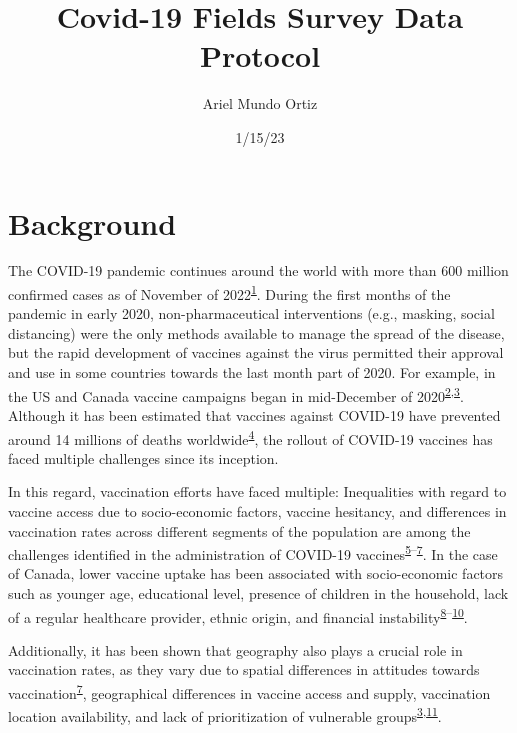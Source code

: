 \documentclass[
  letterpaper,
  DIV=11,
  numbers=noendperiod]{scrartcl}
\title{Covid-19 Fields Survey Data Protocol}
\author{Ariel Mundo Ortiz}
\date{1/15/23}
\begin{document}
\maketitle
\ifdefined\Shaded\renewenvironment{Shaded}{\begin{tcolorbox}[borderline west={3pt}{0pt}{shadecolor}, enhanced, boxrule=0pt, breakable, sharp corners, interior hidden, frame hidden]}{\end{tcolorbox}}\fi

\hypertarget{background}{%
\section{Background}\label{background}}

The COVID-19 pandemic continues around the world with more than 600
million confirmed cases as of November of
2022\textsuperscript{\protect\hyperlink{ref-WHO-Covid}{1}}. During the
first months of the pandemic in early 2020, non-pharmaceutical
interventions (e.g., masking, social distancing) were the only methods
available to manage the spread of the disease, but the rapid development
of vaccines against the virus permitted their approval and use in some
countries towards the last month part of 2020. For example, in the US
and Canada vaccine campaigns began in mid-December of
2020\textsuperscript{\protect\hyperlink{ref-tanne2020}{2},\protect\hyperlink{ref-bogoch2022}{3}}.
Although it has been estimated that vaccines against COVID-19 have
prevented around 14 millions of deaths
worldwide\textsuperscript{\protect\hyperlink{ref-watson2022}{4}}, the
rollout of COVID-19 vaccines has faced multiple challenges since its
inception.

In this regard, vaccination efforts have faced multiple: Inequalities
with regard to vaccine access due to socio-economic factors, vaccine
hesitancy, and differences in vaccination rates across different
segments of the population are among the challenges identified in the
administration of COVID-19
vaccines\textsuperscript{\protect\hyperlink{ref-gerretsen2021}{5}--\protect\hyperlink{ref-malik2020}{7}}.
In the case of Canada, lower vaccine uptake has been associated with
socio-economic factors such as younger age, educational level, presence
of children in the household, lack of a regular healthcare provider,
ethnic origin, and financial
instability\textsuperscript{\protect\hyperlink{ref-guay2022}{8}--\protect\hyperlink{ref-carter2022}{10}}.

Additionally, it has been shown that geography also plays a crucial role
in vaccination rates, as they vary due to spatial differences in
attitudes towards
vaccination\textsuperscript{\protect\hyperlink{ref-malik2020}{7}},
geographical differences in vaccine access and supply, vaccination
location availability, and lack of prioritization of vulnerable
groups\textsuperscript{\protect\hyperlink{ref-bogoch2022}{3},\protect\hyperlink{ref-nguyen2021}{11}}.
\end{document}
